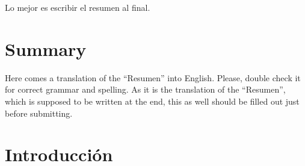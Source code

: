 \documentclass[a4paper, 12pt]{book}
\begin{document}
Lo mejor es escribir el resumen al final.


\chapter*{Summary}

Here comes a translation of the ``Resumen'' into English. 
Please, double check it for correct grammar and spelling.
As it is the translation of the ``Resumen'', which is supposed to be written at the end, this as well should be filled out just before submitting.





\tableofcontents 
\cleardoublepage
\listoffigures %
\cleardoublepage
\listoflistings


\cleardoublepage
\chapter{Introducción}
\label{sec:intro}
\end{document}
